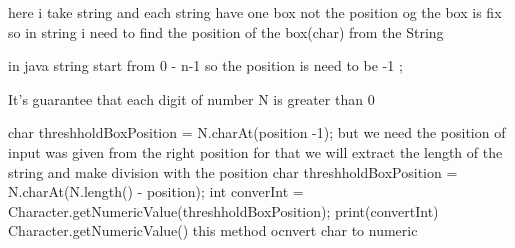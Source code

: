 here i take string and each string have one box 
not the position og the box is fix
so in string i need to find the position of the box(char) from the String

in java string start from 0 - n-1 
so the position is need to be -1 ;

It's guarantee that each digit of number N
 is greater than 0

char threshholdBoxPosition = N.charAt(position -1);
but we need the position of input was given from the right position 
for that we will extract the length of the string and make division with the position 
    char threshholdBoxPosition = N.charAt(N.length() - position);
            int converInt = Character.getNumericValue(threshholdBoxPosition);
print(convertInt)
            Character.getNumericValue() this method ocnvert char to numeric

